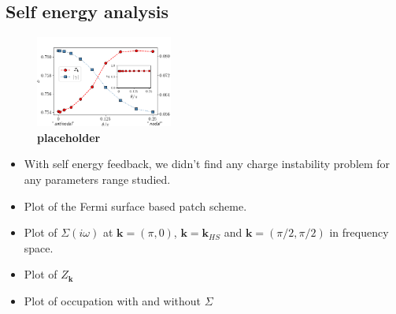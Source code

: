 \subsection{Self energy analysis}

\begin{figure}
\includegraphics[width=0.4\textwidth]{images/z_and_gamma975.png}
\caption{\textbf{placeholder} }
\label{fig:zetaandgamma}
\end{figure}

\begin{itemize}

\item With self energy feedback, we didn't find any charge instability problem for any parameters range studied.

\item Plot of the Fermi surface based patch scheme.

\item Plot of $\Sigma(i\omega)$ at $\boldsymbol{k}=(\pi,0)$, $\boldsymbol{k}=\boldsymbol{k}_{HS}$ and $\boldsymbol{k}=(\pi/2,\pi/2)$ in frequency space.

\item Plot of $Z_{\boldsymbol{k}}$

\item Plot of occupation with and without $\Sigma$

\end{itemize}
